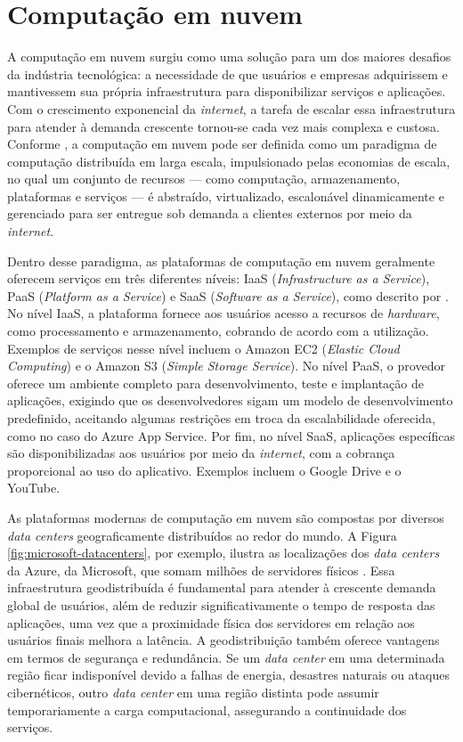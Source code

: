 \documentclass[
	12pt,				%
	oneside,			%
	a4paper,			%
	english,			%
	brazil				%
	]{abntex2ppgsi}
\begin{document}
\section{Computação em nuvem}\label{section:computacao-nuvem}

A computação em nuvem surgiu como uma solução para um dos maiores desafios da indústria tecnológica: a necessidade de que usuários e empresas adquirissem e mantivessem sua própria infraestrutura para disponibilizar serviços e aplicações. Com o crescimento exponencial da \textit{internet}, a tarefa de escalar essa infraestrutura para atender à demanda crescente tornou-se cada vez mais complexa e custosa. Conforme , a computação em nuvem pode ser definida como um paradigma de computação distribuída em larga escala, impulsionado pelas economias de escala, no qual um conjunto de recursos --- como computação, armazenamento, plataformas e serviços --- é abstraído, virtualizado, escalonável dinamicamente e gerenciado para ser entregue sob demanda a clientes externos por meio da \textit{internet}.

Dentro desse paradigma, as plataformas de computação em nuvem geralmente oferecem serviços em três diferentes níveis: IaaS (\textit{Infrastructure as a Service}), PaaS (\textit{Platform as a Service}) e SaaS (\textit{Software as a Service}), como descrito por . No nível IaaS, a plataforma fornece aos usuários acesso a recursos de \textit{hardware}, como processamento e armazenamento, cobrando de acordo com a utilização. Exemplos de serviços nesse nível incluem o Amazon EC2 (\textit{Elastic Cloud Computing}) e o Amazon S3 (\textit{Simple Storage Service}). No nível PaaS, o provedor oferece um ambiente completo para desenvolvimento, teste e implantação de aplicações, exigindo que os desenvolvedores sigam um modelo de desenvolvimento predefinido, aceitando algumas restrições em troca da escalabilidade oferecida, como no caso do Azure App Service. Por fim, no nível SaaS, aplicações específicas são disponibilizadas aos usuários por meio da \textit{internet}, com a cobrança proporcional ao uso do aplicativo. Exemplos incluem o Google Drive e o YouTube.

As plataformas modernas de computação em nuvem são compostas por diversos \textit{data centers} geograficamente distribuídos ao redor do mundo. A Figura \ref{fig:microsoft-datacenters}, por exemplo, ilustra as localizações dos \textit{data centers} da Azure, da Microsoft, que somam milhões de servidores físicos . Essa infraestrutura geodistribuída é fundamental para atender à crescente demanda global de usuários, além de reduzir significativamente o tempo de resposta das aplicações, uma vez que a proximidade física dos servidores em relação aos usuários finais melhora a latência. A geodistribuição também oferece vantagens em termos de segurança e redundância. Se um \textit{data center} em uma determinada região ficar indisponível devido a falhas de energia, desastres naturais ou ataques cibernéticos, outro \textit{data center} em uma região distinta pode assumir temporariamente a carga computacional, assegurando a continuidade dos serviços.
\end{document}
